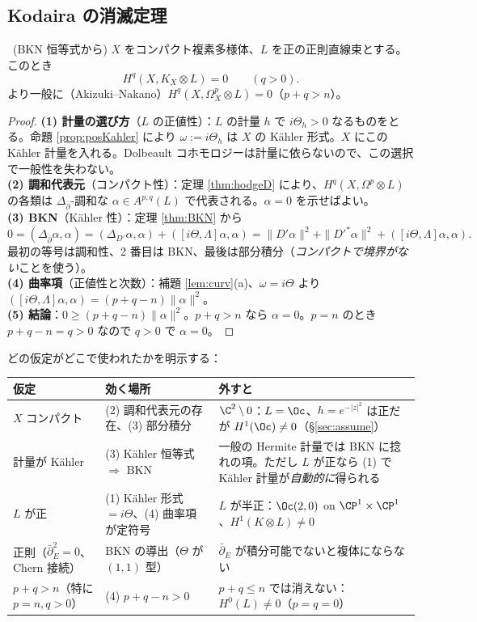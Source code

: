 \subsection{Kodaira の消滅定理}
\begin{thm}\label{thm:kodaira}\tP\ (BKN 恒等式から)
$X$ をコンパクト複素多様体、$L$ を正の正則直線束とする。このとき
\[
H^q(X,K_X\otimes L)=0\qquad(q>0).
\]
より一般に（Akizuki--Nakano）$H^q(X,\Omega^p_X\otimes L)=0$（$p+q>n$）。
\end{thm}
\begin{proof}
\textbf{(1) 計量の選び方}（$L$ の正値性）：$L$ の計量 $h$ で $i\Theta_h>0$ なるものをとる。命題 \ref{prop:posKahler} により $\omega:=i\Theta_h$ は $X$ の Kähler 形式。$X$ にこの Kähler 計量を入れる。Dolbeault コホモロジーは計量に依らないので、この選択で一般性を失わない。\\
\textbf{(2) 調和代表元}（コンパクト性）：定理 \ref{thm:hodgeD} により、$H^q(X,\Omega^p\otimes L)$ の各類は $\Delta_{\bar\partial}$-調和な $\alpha\in A^{p,q}(L)$ で代表される。$\alpha=0$ を示せばよい。\\
\textbf{(3) BKN}（Kähler 性）：定理 \ref{thm:BKN} から
\[
0=(\Delta_{\bar\partial}\alpha,\alpha)=(\Delta_{D'}\alpha,\alpha)+([i\Theta,\Lambda]\alpha,\alpha)=\|D'\alpha\|^2+\|D'^*\alpha\|^2+([i\Theta,\Lambda]\alpha,\alpha).
\]
最初の等号は調和性、2 番目は BKN、最後は部分積分（\emph{コンパクトで境界がない}ことを使う）。\\
\textbf{(4) 曲率項}（正値性と次数）：補題 \ref{lem:curv}(a)、$\omega=i\Theta$ より $([i\Theta,\Lambda]\alpha,\alpha)=(p+q-n)\|\alpha\|^2$。\\
\textbf{(5) 結論}：$0\ge(p+q-n)\|\alpha\|^2$。$p+q>n$ なら $\alpha=0$。$p=n$ のとき $p+q-n=q>0$ なので $q>0$ で $\alpha=0$。
\end{proof}
どの仮定がどこで使われたかを明示する：
\begin{center}
\small
\begin{tabular}{p{}p{}p{}}
\toprule
仮定 & 効く場所 & 外すと\\\midrule
$X$ コンパクト & (2) 調和代表元の存在、(3) 部分積分 & $\C^2\setminus0$：$L=\Oc$、$h=e^{-|z|^2}$ は正だが $H^1(\Oc)\neq0$（\S\ref{sec:assume}）\\
計量が Kähler & (3) Kähler 恒等式 $\Rightarrow$ BKN & 一般の Hermite 計量では BKN に捻れの項。ただし $L$ が正なら (1) で Kähler 計量が\emph{自動的に}得られる\\
$L$ が正 & (1) Kähler 形式 $=i\Theta$、(4) 曲率項が定符号 & $L$ が半正：$\Oc(2,0)$ on $\CP^1\times\CP^1$、$H^1(K\otimes L)\ne0$\\
正則（$\bar\partial_E^2=0$、Chern 接続） & BKN の導出（$\Theta$ が $(1,1)$ 型） & $\bar\partial_E$ が積分可能でないと複体にならない\\
$p+q>n$（特に $p=n,q>0$） & (4) $p+q-n>0$ & $p+q\le n$ では消えない：$H^0(L)\neq0$（$p=q=0$）\\\bottomrule
\end{tabular}
\end{center}

